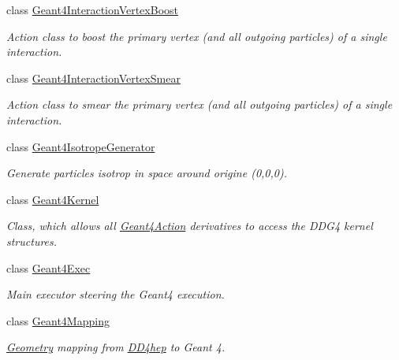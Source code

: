 \begin{DoxyCompactItemize}
class \hyperlink{class_d_d4hep_1_1_simulation_1_1_geant4_interaction_vertex_boost}{Geant4InteractionVertexBoost}
\begin{DoxyCompactList}\small\item\em Action class to boost the primary vertex (and all outgoing particles) of a single interaction. \item\end{DoxyCompactList}\item 
class \hyperlink{class_d_d4hep_1_1_simulation_1_1_geant4_interaction_vertex_smear}{Geant4InteractionVertexSmear}
\begin{DoxyCompactList}\small\item\em Action class to smear the primary vertex (and all outgoing particles) of a single interaction. \item\end{DoxyCompactList}\item 
class \hyperlink{class_d_d4hep_1_1_simulation_1_1_geant4_isotrope_generator}{Geant4IsotropeGenerator}
\begin{DoxyCompactList}\small\item\em Generate particles isotrop in space around origine (0,0,0). \item\end{DoxyCompactList}\item 
class \hyperlink{class_d_d4hep_1_1_simulation_1_1_geant4_kernel}{Geant4Kernel}
\begin{DoxyCompactList}\small\item\em Class, which allows all \hyperlink{class_d_d4hep_1_1_simulation_1_1_geant4_action}{Geant4Action} derivatives to access the DDG4 kernel structures. \item\end{DoxyCompactList}\item 
class \hyperlink{class_d_d4hep_1_1_simulation_1_1_geant4_exec}{Geant4Exec}
\begin{DoxyCompactList}\small\item\em Main executor steering the Geant4 execution. \item\end{DoxyCompactList}\item 
class \hyperlink{class_d_d4hep_1_1_simulation_1_1_geant4_mapping}{Geant4Mapping}
\begin{DoxyCompactList}\small\item\em \hyperlink{namespace_d_d4hep_1_1_geometry}{Geometry} mapping from \hyperlink{namespace_d_d4hep}{DD4hep} to Geant 4. \item\end{DoxyCompactList}\item 

\end{DoxyCompactItemize}
